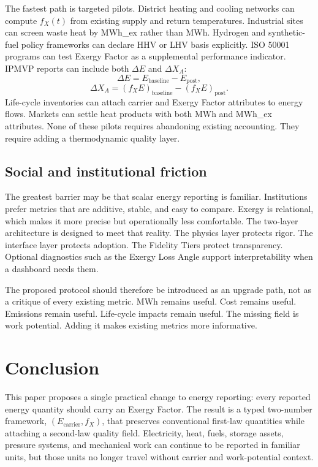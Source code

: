 \documentclass[11pt]{article}
\newcommand{\fx}{f_X}
\begin{document}
The fastest path is targeted pilots. District heating and cooling networks can compute $\fx(t)$ from existing supply and return temperatures. Industrial sites can screen waste heat by MWh\_ex rather than MWh. Hydrogen and synthetic-fuel policy frameworks can declare HHV or LHV basis explicitly. ISO 50001 programs can test Exergy Factor as a supplemental performance indicator. IPMVP reports can include both $\Delta E$ and $\Delta X_A$:
\begin{equation}
\Delta E=E_{\mathrm{baseline}}-E_{\mathrm{post}},
\end{equation}
\begin{equation}
\Delta X_A=(\fx E)_{\mathrm{baseline}}-(\fx E)_{\mathrm{post}}.
\end{equation}
Life-cycle inventories can attach carrier and Exergy Factor attributes to energy flows. Markets can settle heat products with both MWh and MWh\_ex attributes. None of these pilots requires abandoning existing accounting. They require adding a thermodynamic quality layer.

\subsection{Social and institutional friction}

The greatest barrier may be that scalar energy reporting is familiar. Institutions prefer metrics that are additive, stable, and easy to compare. Exergy is relational, which makes it more precise but operationally less comfortable. The two-layer architecture is designed to meet that reality. The physics layer protects rigor. The interface layer protects adoption. The Fidelity Tiers protect transparency. Optional diagnostics such as the Exergy Loss Angle support interpretability when a dashboard needs them.

The proposed protocol should therefore be introduced as an upgrade path, not as a critique of every existing metric. MWh remains useful. Cost remains useful. Emissions remain useful. Life-cycle impacts remain useful. The missing field is work potential. Adding it makes existing metrics more informative.

\section{Conclusion}

This paper proposes a single practical change to energy reporting: every reported energy quantity should carry an Exergy Factor. The result is a typed two-number framework, $(E_{\mathrm{carrier}},\fx)$, that preserves conventional first-law quantities while attaching a second-law quality field. Electricity, heat, fuels, storage assets, pressure systems, and mechanical work can continue to be reported in familiar units, but those units no longer travel without carrier and work-potential context.
\end{document}
